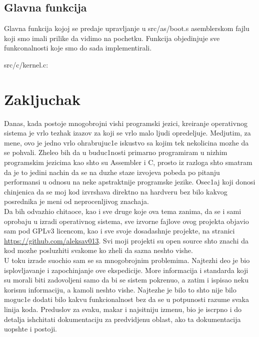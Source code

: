 \documentclass[a4paper,fleqn,12pt]{JMThesis}
\newcommand\eng{\fontencoding{OT1}\fontfamily{\rmdefault}\selectfont}
\newcommand\srb{\fontencoding{OT2}\fontfamily{\rmdefault}\selectfont}
\begin{document}
\section{Glavna funkcija}
\medskip

Glavna funkcija kojoj se predaje upravljanje u {\eng src/as/boot.s}
asemblerskom fajlu koji smo imali prilike da vidimo na pochetku. Funkcija
objedinjuje sve funkconalnosti koje smo do sada implementirali.

{\eng src/c/kernel.c}:

\medskip\begin{minipage}{\textwidth}\eng\srb\end{minipage}\smallskip


\chapter{Zakljuchak}

Danas, kada postoje mnogobrojni vishi programski jezici, kreiranje operativnog
sistema je vrlo tezhak izazov za koji se vrlo malo ljudi opredeljuje. Medjutim,
za mene, ovo je jedno vrlo ohrabrujuc1e iskustvo sa kojim tek nekolicina mozhe
da se pohvali. Zheleo bih da u buduc1nosti primarno programiram u nizhim
programskim jezicima kao shto su {\eng Assembler} i {\eng C}, prosto iz razloga
shto smatram da je to jedini nachin da se na duzhe staze izvojeva pobeda po
pitanju performansi u odnosu na neke apstraktnije programske jezike. Osec1aj
koji donosi chinjenica da se moj kod izvrshava direktno na hardveru bez bilo
kakvog posrednika je meni od neprocenljivog znachaja.\\

Da bih odvazhio chitaoce, kao i sve druge koje ova tema zanima, da se i sami
oprobaju u izradi operativnog sistema, sve izvorne fajlove ovog projekta
objavio sam pod {\eng GPLv3} licencom, kao i sve svoje dosadashnje projekte, na
stranici {\eng\url{https://github.com/aleksav013}}. Svi moji projekti su {\eng
open source} shto znachi da kod mozhe posluzhiti svakome ko zheli da sazna
neshto vishe.\\

U toku izrade suochio sam se sa mnogobrojnim problemima. Najtezhi deo je bio
isplovljavanje i zapochinjanje ove ekspedicije. More informacija i standarda
koji su morali biti zadovoljeni samo da bi se sistem pokrenuo, a zatim i
ispisao neku korisnu informaciju, a kamoli neshto vishe. Najtezhe je bilo to
shto nije bilo moguc1e dodati bilo kakvu funkcionalnost bez da se u potpunosti
razume svaka linija koda. Preduslov za svaku, makar i najsitniju izmenu, bio je
iscrpno i do detalja ish\/chitati dokumentaciju za predvidjenu oblast, ako ta
dokumentacija uopshte i postoji.\\
\end{document}
